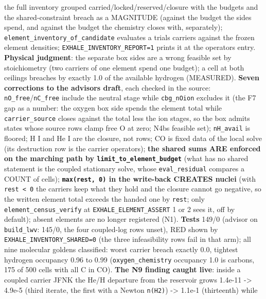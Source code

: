 \documentclass[english,a4paper]{my_memo}
\begin{document}
\begin{itemize}
  the full inventory grouped carried/locked/reserved/closure with the
  budgets and the shared-constraint breach as a MAGNITUDE (against the
  budget the sides spend, and against the budget the chemistry closes
  with, separately); \texttt{element\_inventory\_of\_candidate} evaluates a trial\textquotesingle s
  carriers against the frozen element densities; \texttt{EXHALE\_INVENTORY\_REPORT=1}
  prints it at the operator\textquotesingle s entry. \textbf{Physical judgment}: the separate box
  sides are a wrong feasible set by stoichiometry (two carriers of one
  element spend one budget); a cell at both ceilings breaches by exactly
  1.0 of the available hydrogen (MEASURED). \textbf{Seven corrections to the
  advisor\textquotesingle s draft}, each checked in the source: \texttt{nO\_free}/\texttt{nC\_free}
  include the neutral stage while \texttt{cbg\_nOion} excludes it (the F7 gap as a
  number: the oxygen box side spends the element total while
  \texttt{carrier\_source} closes against the total less the ion stages, so the
  box admits states whose source rows clamp free O at zero; N4b\textquotesingle s feasible
  set); \texttt{nH\_avail} is floored; H I and He I are the closure, not rows; CO
  is fixed data of the local solve (its destruction row is the carrier
  operator\textquotesingle s); \textbf{the shared sums ARE enforced on the marching path by
  \texttt{limit\_to\_element\_budget}} (what has no shared statement is the coupled
  stationary solve, whose \texttt{eval\_residual} compares a COUNT of cells);
  \textbf{\texttt{max(rest,\ 0)} in the write-back CREATES nuclei} (with \texttt{rest\ \textless{}\ 0} the
  carriers keep what they hold and the closure cannot go negative, so the
  written element total exceeds the handed one by \texttt{\textbar{}rest\textbar{}}; only
  \texttt{element\_census\_verify} at \texttt{EXHALE\_ELEMENT\_ASSERT} 1 or 2 sees it, off by
  default); absent elements are no longer registered (N1). \textbf{Tests} 149/0
  (advisor on \texttt{build\_lwv}: 145/0, the four coupled-log rows unset), RED
  shown by \texttt{EXHALE\_INVENTORY\_SHARED=0} (the three infeasibility rows fail
  in that arm); all nine molecular goldens classified: worst carrier breach
  exactly 0.0, tightest hydrogen occupancy 0.96 to 0.99
  (\texttt{oxygen\_chemistry} occupancy 1.0 is carbon\textquotesingle s, 175 of 500 cells with all
  C in CO). \textbf{The N9 finding caught live}: inside a coupled carrier JFNK
  the He/H departure from the reservoir grows 1.4e-11 -\textgreater{} 4.9e-5 (third
  iterate, the first with a Newton \texttt{n(H2)}) -\textgreater{} 1.1e-1 (thirteenth) while

\end{itemize}
\end{document}
